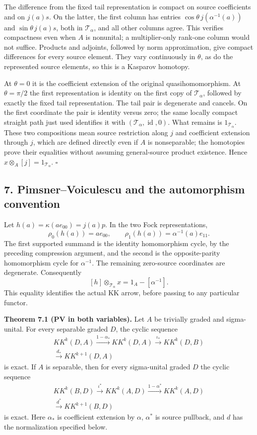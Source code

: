 \documentclass[
  11pt,
]{article}
\begin{document}
The difference from the fixed tail representation is compact on source
coefficients and on \(j(a)s\). On the latter, the first column has
entries \(\cos\theta\,j(\alpha^{-1}(a))\) and \(\sin\theta\,j(a)s\),
both in \(\mathcal T_\alpha\), and all other columns agree. This
verifies compactness even when \(A\) is nonunital; a multiplier-only
rank-one column would not suffice. Products and adjoints, followed by
norm approximation, give compact differences for every source element.
They vary continuously in \(\theta\), as do the represented source
elements, so this is a Kasparov homotopy.

At \(\theta=0\) it is the coefficient extension of the original
quasihomomorphism. At \(\theta=\pi/2\) the first representation is
identity on the first copy of \(\mathcal T_\alpha\), followed by exactly
the fixed tail representation. The tail pair is degenerate and cancels.
On the first coordinate the pair is identity versus zero; the same
locally compact straight path just used identifies it with
\((\mathcal T_\alpha,\operatorname{id},0)\). What remains is
\(1_{\mathcal T_\alpha}\). These two compositions mean source
restriction along \(j\) and coefficient extension through \(j\), which
are defined directly even if \(A\) is nonseparable; the homotopies prove
their equalities without assuming general-source product existence.
Hence \(x\otimes_A[j]=1_{\mathcal T_\alpha}\). \(\square\)

\subsection{7. Pimsner--Voiculescu and the automorphism
convention}\label{pimsnervoiculescu-and-the-automorphism-convention}

Let \(h(a)=\kappa(ae_{00})=j(a)p\). In the two Fock representations, \[
\rho_0(h(a))=a e_{00},\qquad
\rho_1(h(a))=\alpha^{-1}(a)e_{11}.
\tag{7.1}
\] The first supported summand is the identity homomorphism cycle, by
the preceding compression argument, and the second is the
opposite-parity homomorphism cycle for \(\alpha^{-1}\). The remaining
zero-source coordinates are degenerate. Consequently \[
[h]\otimes_{\mathcal T_\alpha}x
=1_A-[\alpha^{-1}].
\tag{7.2}
\] This equality identifies the actual KK arrow, before passing to any
particular functor.

\textbf{Theorem 7.1 (PV in both variables).} Let \(A\) be trivially
graded and sigma-unital. For every separable graded \(D\), the cyclic
sequence \[
\begin{gathered}
KK^k(D,A)\xrightarrow{1-\alpha_*}
KK^k(D,A)\xrightarrow{\iota_*}KK^k(D,B)\\
\xrightarrow{d_*}KK^{k+1}(D,A)
\end{gathered}
\tag{7.3}
\] is exact. If \(A\) is separable, then for every sigma-unital graded
\(D\) the cyclic sequence \[
\begin{gathered}
KK^k(B,D)\xrightarrow{\iota^*}KK^k(A,D)
\xrightarrow{1-\alpha^*}KK^k(A,D)\\
\xrightarrow{d^*}KK^{k+1}(B,D)
\end{gathered}
\tag{7.4}
\] is exact. Here \(\alpha_*\) is coefficient extension by \(\alpha\),
\(\alpha^*\) is source pullback, and \(d\) has the normalization
specified below.
\end{document}

